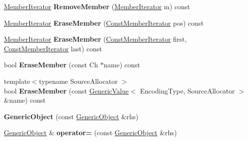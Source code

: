 \begin{DoxyCompactItemize}
\item 
\hyperlink{class_generic_member_iterator}{Member\+Iterator} {\bfseries Remove\+Member} (\hyperlink{class_generic_member_iterator}{Member\+Iterator} m) const \hypertarget{class_generic_object_a2489d8522f3c38324df69f6184cd639a}{}\label{class_generic_object_a2489d8522f3c38324df69f6184cd639a}

\item 
\hyperlink{class_generic_member_iterator}{Member\+Iterator} {\bfseries Erase\+Member} (\hyperlink{class_generic_member_iterator}{Const\+Member\+Iterator} pos) const \hypertarget{class_generic_object_a85ed6e1f586c775a02aaa99d0deabcb4}{}\label{class_generic_object_a85ed6e1f586c775a02aaa99d0deabcb4}

\item 
\hyperlink{class_generic_member_iterator}{Member\+Iterator} {\bfseries Erase\+Member} (\hyperlink{class_generic_member_iterator}{Const\+Member\+Iterator} first, \hyperlink{class_generic_member_iterator}{Const\+Member\+Iterator} last) const \hypertarget{class_generic_object_a04c3ce4a9076ab2f7e8f6c5031456c29}{}\label{class_generic_object_a04c3ce4a9076ab2f7e8f6c5031456c29}

\item 
bool {\bfseries Erase\+Member} (const Ch $\ast$name) const \hypertarget{class_generic_object_abcf63f10bbc634620e03bf8b375fa6fd}{}\label{class_generic_object_abcf63f10bbc634620e03bf8b375fa6fd}

\item 
{\footnotesize template$<$typename Source\+Allocator $>$ }\\bool {\bfseries Erase\+Member} (const \hyperlink{class_generic_value}{Generic\+Value}$<$ Encoding\+Type, Source\+Allocator $>$ \&name) const \hypertarget{class_generic_object_afda9d121d16de8b70f7bf09621851218}{}\label{class_generic_object_afda9d121d16de8b70f7bf09621851218}

\item 
{\bfseries Generic\+Object} (const \hyperlink{class_generic_object}{Generic\+Object} \&rhs)\hypertarget{class_generic_object_a10173c42d0e8a71ca0e3ae75d800887a}{}\label{class_generic_object_a10173c42d0e8a71ca0e3ae75d800887a}

\item 
\hyperlink{class_generic_object}{Generic\+Object} \& {\bfseries operator=} (const \hyperlink{class_generic_object}{Generic\+Object} \&rhs)\hypertarget{class_generic_object_af8984f76d6f3b13039c6d3b8e217f747}{}\label{class_generic_object_af8984f76d6f3b13039c6d3b8e217f747}


\end{DoxyCompactItemize}
